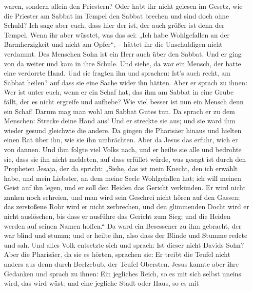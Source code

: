 waren, sondern allein den Priestern?  Oder habt ihr nicht
gelesen im Gesetz, wie die Priester am Sabbat im Tempel den Sabbat
brechen und sind doch ohne Schuld?  Ich sage aber euch, dass
hier der ist, der auch größer ist denn der Tempel.  Wenn ihr
aber wüsstet, was das sei: „Ich habe Wohlgefallen an der Barmherzigkeit
und nicht am Opfer``, -- hättet ihr die Unschuldigen nicht verdammt.
 Des Menschen Sohn ist ein Herr auch über den Sabbat.
 Und er ging von da weiter und kam in ihre Schule.
 Und siehe, da war ein Mensch, der hatte eine verdorrte
Hand. Und sie fragten ihn und sprachen: Ist's auch recht, am Sabbat
heilen? auf dass sie eine Sache wider ihn hätten.  Aber er
sprach zu ihnen: Wer ist unter euch, wenn er ein Schaf hat, das ihm am
Sabbat in eine Grube fällt, der es nicht ergreife und aufhebe?
 Wie viel besser ist nun ein Mensch denn ein Schaf! Darum
mag man wohl am Sabbat Gutes tun.  Da sprach er zu dem
Menschen: Strecke deine Hand aus! Und er streckte sie aus; und sie ward
ihm wieder gesund gleichwie die andere.  Da gingen die
Pharisäer hinaus und hielten einen Rat über ihn, wie sie ihn umbrächten.
 Aber da Jesus das erfuhr, wich er von dannen. Und ihm
folgte viel Volks nach, und er heilte sie alle  und
bedrohte sie, dass sie ihn nicht meldeten,  auf dass
erfüllet würde, was gesagt ist durch den Propheten Jesaja, der da
spricht:  „Siehe, das ist mein Knecht, den ich erwählt
habe, und mein Liebster, an dem meine Seele Wohlgefallen hat; ich will
meinen Geist auf ihn legen, und er soll den Heiden das Gericht
verkünden.  Er wird nicht zanken noch schreien, und man
wird sein Geschrei nicht hören auf den Gassen;  das
zerstoßene Rohr wird er nicht zerbrechen, und den glimmenden Docht wird
er nicht auslöschen, bis dass er ausführe das Gericht zum Sieg;
 und die Heiden werden auf seinen Namen hoffen.``
 Da ward ein Besessener zu ihm gebracht, der war blind und
stumm; und er heilte ihn, also dass der Blinde und Stumme redete und
sah.  Und alles Volk entsetzte sich und sprach: Ist dieser
nicht Davids Sohn?  Aber die Pharisäer, da sie es hörten,
sprachen sie: Er treibt die Teufel nicht anders aus denn durch
Beelzebub, der Teufel Obersten.  Jesus kannte aber ihre
Gedanken und sprach zu ihnen: Ein jegliches Reich, so es mit sich selbst
uneins wird, das wird wüst; und eine jegliche Stadt oder Haus, so es mit
